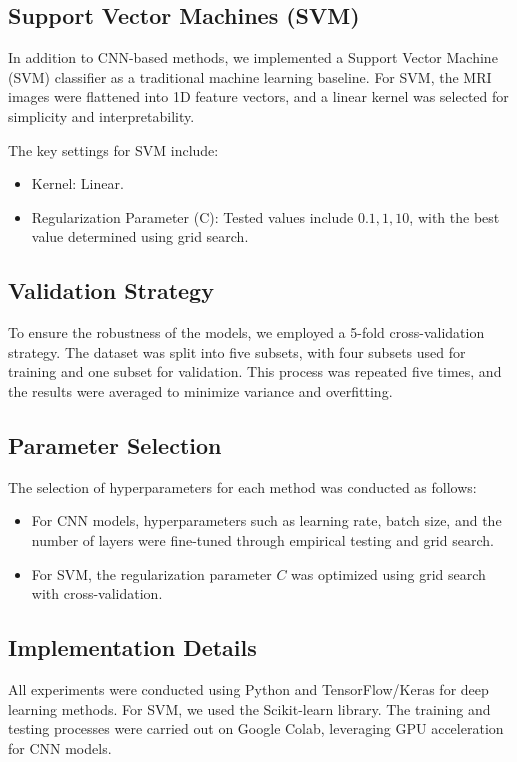 \documentclass[runningheads]{llncs}
\begin{document}
\subsection{Support Vector Machines (SVM)}
In addition to CNN-based methods, we implemented a Support Vector Machine (SVM) classifier as a traditional machine learning baseline. For SVM, the MRI images were flattened into 1D feature vectors, and a linear kernel was selected for simplicity and interpretability.

The key settings for SVM include:
\begin{itemize}
    \item Kernel: Linear.
    \item Regularization Parameter (C): Tested values include $0.1, 1, 10$, with the best value determined using grid search.
\end{itemize}

\subsection{Validation Strategy}
To ensure the robustness of the models, we employed a 5-fold cross-validation strategy. The dataset was split into five subsets, with four subsets used for training and one subset for validation. This process was repeated five times, and the results were averaged to minimize variance and overfitting.

\subsection{Parameter Selection}
The selection of hyperparameters for each method was conducted as follows:
\begin{itemize}
    \item For CNN models, hyperparameters such as learning rate, batch size, and the number of layers were fine-tuned through empirical testing and grid search.
    \item For SVM, the regularization parameter \( C \) was optimized using grid search with cross-validation.
\end{itemize}

\subsection{Implementation Details}
All experiments were conducted using Python and TensorFlow/Keras for deep learning methods. For SVM, we used the Scikit-learn library. The training and testing processes were carried out on Google Colab, leveraging GPU acceleration for CNN models.

\begin{comment}
\begin{figure}[htbp]
    \centering
    \texttt{[image: training\_pipeline.png]}
    \caption{Overview of the training and evaluation pipeline.}
    \label{fig:training_pipeline}
\end{figure}
\end{comment}

\sloppy


\end{document}
